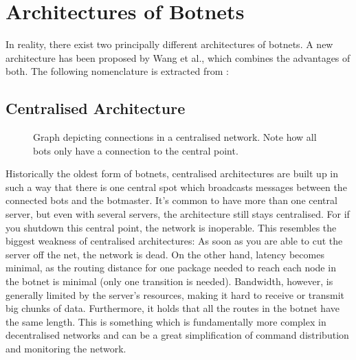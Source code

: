 \documentclass{llncs}
\begin{document}
\section{Architectures of Botnets}
\label{architecture}
In reality, there exist two principally different architectures of
botnets. A new architecture has been proposed by Wang et al.\cite{td1sc}, which
combines the advantages of both. The following nomenclature is
extracted from \cite{steggink2007detection}:
\subsection{Centralised Architecture}
%
%
\begin{figure}[htbp]
  \centering
  \caption{Graph depicting connections in a centralised network. Note
    how all bots only have a connection to the central point. }
  \label{central-network}
\end{figure}
Historically the oldest form of botnets, centralised architectures are
built up in such a way that there is one central spot which broadcasts
messages between the connected bots and the botmaster.  It's common to
have more than one central server\cite{td1sc}, but even with several
servers, the architecture still stays centralised. For if you shutdown
this central point, the network is inoperable. This resembles the
biggest weakness of centralised architectures: As soon as you are able
to cut the server off the net, the network is dead. On the other hand,
latency becomes minimal, as the routing distance for one package
needed to reach each node in the botnet is minimal (only one
transition is needed). Bandwidth, however, is generally limited by the
server's resources, making it hard to receive or transmit big chunks
of data. Furthermore, it holds that all the routes in the botnet have
the same length. This is something which is fundamentally more complex
in decentralised networks and can be a great simplification of command
distribution and monitoring the network.
\end{document}
